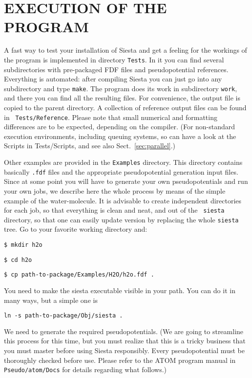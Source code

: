 \documentclass[11pt]{article}
\begin{document}
\section{EXECUTION OF THE PROGRAM}

A fast way to test your installation of {\sc Siesta} and get a feeling
for the workings of the program is implemented in directory
{\tt Tests}. In it you can find several subdirectories
with pre-packaged FDF files and pseudopotential references. Everything
is automated: after compiling {\sc Siesta} you can just go into any
subdirectory and type {\tt make}. The program does its work in
subdirectory {\tt work}, and there you can find all the resulting
files. For convenience, the output file is copied to the parent
directory. A collection of reference output files can be found in {\tt
  Tests/Reference}. Please note that small numerical and
formatting differences are to be expected, depending on the compiler.
(For non-standard execution environments, including queuing systems,
so can have a look at the Scripts in Tests/Scripts, and see also Sect.~\ref{sec:parallel}.)

Other examples are provided in the {\tt Examples} directory. This
directory contains basically {\tt .fdf} files and the appropriate
pseudopotential generation input files. Since at some point you will
have to generate your own pseudopotentials and run your own jobs, we
describe here the whole process by means of the simple example of the
water-molecule. It is advisable to create independent directories for
each job, so that everything is clean and neat, and out of the {\tt
siesta} directory, so that one can easily update version by replacing
the whole {\tt siesta} tree. Go to your favorite working directory
and:

{\tt \$ mkdir h2o}

{\tt \$ cd h2o}

{\tt \$ cp path-to-package/Examples/H2O/h2o.fdf .}

You need to make the siesta executable visible in your path. 
You can do it in many ways, but a simple one is

{\tt ln -s  path-to-package/Obj/siesta .}

\noindent
We need to generate the required pseudopotentials.
(We are going to streamline this process for this time, but
you must realize that this is a tricky business that you
must master before using {\sc Siesta} responsibly. Every
pseudopotential must be thoroughly checked before use. Please refer to
the {\sc ATOM} program manual in {\tt Pseudo/atom/Docs}
for details regarding what follows.)
\end{document}
